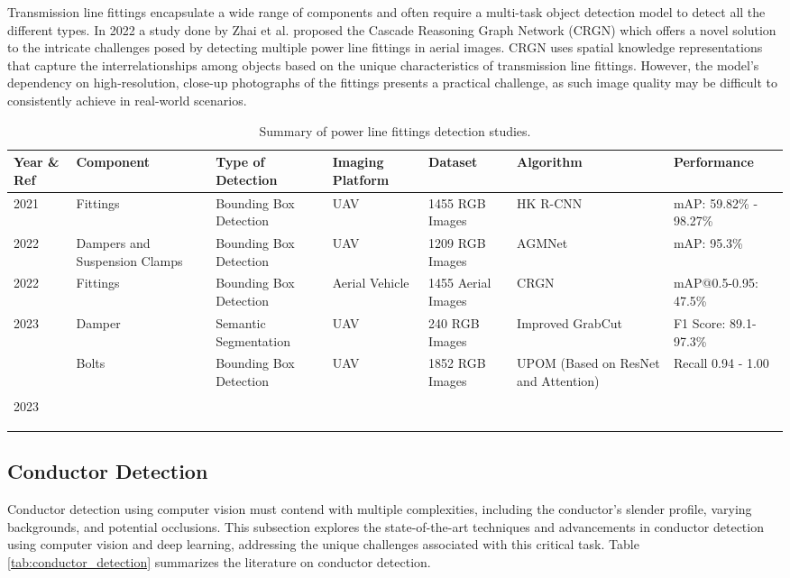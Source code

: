Transmission line fittings encapsulate a wide range of components and often require a multi-task object detection model to detect all the different types. In 2022 a study done by Zhai et al. \cite{zhai_multi_fitting_2022} proposed the Cascade Reasoning Graph Network (CRGN) which offers a novel solution to the intricate challenges posed by detecting multiple power line fittings in aerial images. CRGN uses spatial knowledge representations that capture the interrelationships among objects based on the unique characteristics of transmission line fittings. However, the model's dependency on high-resolution, close-up photographs of the fittings presents a practical challenge, as such image quality may be difficult to consistently achieve in real-world scenarios.

\begin{table*}[htb]
\scriptsize
\caption{Summary of power line fittings detection studies.} \label{tab:fittings_detection}
\begin{tabular}{P{.05} P{.1} P{.15} P{.1} P{.1} P{.15} P{.15}}
\hline
Year \& Ref & Component & Type of Detection & Imaging Platform & Dataset & Algorithm & Performance \\
 \cite{zhai_hybrid_2021} & Fittings & Bounding Box Detection & UAV & 1455 RGB Images & HK R-CNN & mAP: 59.82\% - 98.27\%  \\

2022 \cite{zhang_attention_guided_2022} & Dampers and Suspension Clamps & Bounding Box Detection & UAV & 1209 RGB Images & AGMNet & mAP: 95.3\% \\

2022 \cite{zhai_multi_fitting_2022} & Fittings & Bounding Box Detection & Aerial Vehicle & 1455 Aerial Images & CRGN & mAP@0.5-0.95: 47.5\% \\

2023 \cite{huang_structural_2023} & Damper & Semantic Segmentation & UAV & 240 RGB Images & Improved GrabCut & F1 Score: 89.1-97.3\% \\
\

2023 \cite{luo_ultrasmall_2023} & Bolts & Bounding Box Detection & UAV & 1852 RGB Images & UPOM (Based on ResNet and Attention) & Recall 0.94 - 1.00 \\
\hline
\end{tabular}
\end{table*}

\subsection{Conductor Detection}
Conductor detection using computer vision must contend with multiple complexities, including the conductor's slender profile, varying backgrounds, and potential occlusions. This subsection explores the state-of-the-art techniques and advancements in conductor detection using computer vision and deep learning, addressing the unique challenges associated with this critical task. Table \ref{tab:conductor_detection} summarizes the literature on conductor detection.

